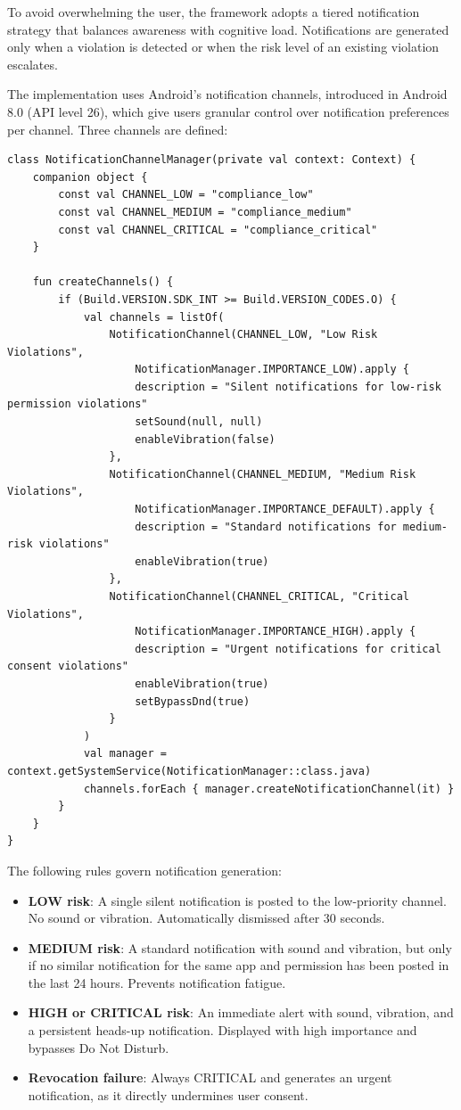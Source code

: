 To avoid overwhelming the user, the framework adopts a tiered notification strategy that balances awareness with cognitive load. Notifications are generated only when a violation is detected or when the risk level of an existing violation escalates.

The implementation uses Android's notification channels, introduced in Android 8.0 (API level 26), which give users granular control over notification preferences per channel. Three channels are defined:

\begin{lstlisting}[caption=Notification channel setup]
class NotificationChannelManager(private val context: Context) {
    companion object {
        const val CHANNEL_LOW = "compliance_low"
        const val CHANNEL_MEDIUM = "compliance_medium"
        const val CHANNEL_CRITICAL = "compliance_critical"
    }
    
    fun createChannels() {
        if (Build.VERSION.SDK_INT >= Build.VERSION_CODES.O) {
            val channels = listOf(
                NotificationChannel(CHANNEL_LOW, "Low Risk Violations", 
                    NotificationManager.IMPORTANCE_LOW).apply {
                    description = "Silent notifications for low-risk permission violations"
                    setSound(null, null)
                    enableVibration(false)
                },
                NotificationChannel(CHANNEL_MEDIUM, "Medium Risk Violations",
                    NotificationManager.IMPORTANCE_DEFAULT).apply {
                    description = "Standard notifications for medium-risk violations"
                    enableVibration(true)
                },
                NotificationChannel(CHANNEL_CRITICAL, "Critical Violations",
                    NotificationManager.IMPORTANCE_HIGH).apply {
                    description = "Urgent notifications for critical consent violations"
                    enableVibration(true)
                    setBypassDnd(true)
                }
            )
            val manager = context.getSystemService(NotificationManager::class.java)
            channels.forEach { manager.createNotificationChannel(it) }
        }
    }
}
\end{lstlisting}

The following rules govern notification generation:

\begin{itemize}
\item \textbf{LOW risk}: A single silent notification is posted to the low-priority channel. No sound or vibration. Automatically dismissed after 30 seconds.
\item \textbf{MEDIUM risk}: A standard notification with sound and vibration, but only if no similar notification for the same app and permission has been posted in the last 24 hours. Prevents notification fatigue.
\item \textbf{HIGH or CRITICAL risk}: An immediate alert with sound, vibration, and a persistent heads-up notification. Displayed with high importance and bypasses Do Not Disturb.
\item \textbf{Revocation failure}: Always CRITICAL and generates an urgent notification, as it directly undermines user consent.
\end{itemize}


